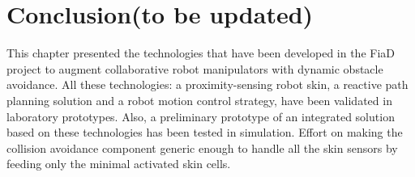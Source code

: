 \section{Conclusion{\color{red}(to be updated)}}
\label{doa:conclusion}
This chapter presented the technologies that have been developed in the FiaD project to augment collaborative robot manipulators with dynamic obstacle avoidance. All these technologies: a proximity-sensing robot skin, a reactive path planning solution and a robot motion control strategy, have been validated in laboratory prototypes. Also, a preliminary prototype of an integrated solution based on these technologies has been tested in simulation. Effort on making the collision avoidance component generic enough to handle all the skin sensors by feeding only the minimal activated skin cells.  